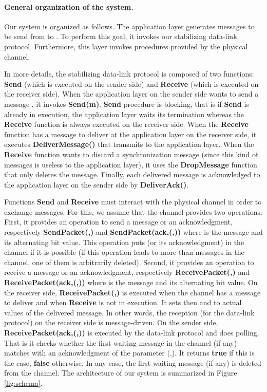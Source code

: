 \documentclass[11pt]{article}
\begin{document}
\paragraph{General organization of the system.}
Our system is organized as follows. The application layer generates messages to be send from  to . To perform this goal, it invokes our stabilizing data-link protocol. Furthermore, this layer invokes procedures provided by the physical channel.

In more details, the stabilizing data-link protocol is composed of two functions: \textbf{Send} (which is executed on the sender side) and \textbf{Receive} (which is executed on the receiver side). When the application layer on the sender side wants to send a message , it invokes \textbf{Send(m)}. \textbf{Send} procedure is blocking, that is if \textbf{Send} is already in execution, the application layer waits its termination whereas the \textbf{Receive} function is always executed on the receiver side. When the \textbf{Receive} function has a message to deliver at the application layer on the receiver side, it executes \textbf{DeliverMessage()} that transmits  to the application layer. When the \textbf{Receive} function wants to discard a synchronization message (since this kind of messages is useless to the application layer), it uses the \textbf{DropMessage} function that only deletes the message. Finally, each delivered message is acknowledged to the application layer on the sender side by \textbf{DeliverAck()}.

Functions \textbf{Send} and \textbf{Receive} must interact with the physical channel in order to exchange messages. For this, we assume that the channel provides two operations. First, it provides an operation to send a message or an acknowledgment, respectively \textbf{SendPacket(,)} and \textbf{SendPacket(ack,(,))} where  is the message and  its alternating bit value. This operation puts  (or its acknowledgment) in the channel if it is possible (if this operation leads to more than  messages in the channel, one of them is arbitrarily deleted). Second, it provides an operation to receive a message or an acknowledgment, respectively \textbf{ReceivePacket(,)} and \textbf{ReceivePacket(ack,(,))} where  is the message and  its alternating bit value. On the receiver side, \textbf{ReceivePacket(,)} is executed when the channel has a message to deliver and when \textbf{Receive} is not in execution. It sets then  and  to actual values of the delivered message. In other words, the reception (for the data-link protocol) on the receiver side is message-driven. On the sender side, \textbf{ReceivePacket(ack,(,))} is executed by the data-link protocol and does polling. That is it checks whether the first waiting message in the channel (if any) matches with an acknowledgment of the parameter (,). It returns \textbf{true} if this is the case, \textbf{false} otherwise. In any case, the first waiting message (if any) is deleted from the channel. The architecture of our system is summarized in Figure \ref{fig:schema}.
\end{document}
